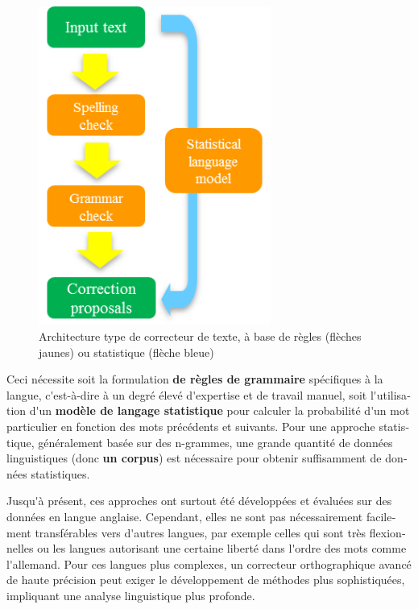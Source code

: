 \documentclass[]{../metanetpaper}
\begin{document}
\begin{french}
\begin{multicols}{2}
\begin{figure}[!ht]
\begin{center}
  \includegraphics[width=3.0in]{../_media/french/french_pix6_spell_checker.png}
\caption{Architecture type de correcteur de texte, à base de règles (flèches jaunes) ou statistique (flèche bleue)}
\label{fig:spellchecker}
\end{center}
\end{figure}

Ceci nécessite soit la formulation {\bf de règles
de grammaire} spécifiques à la langue, c{\mbox '}est-à-dire à un degré élevé d{\mbox '}expertise et de travail
manuel, soit l{\mbox '}utilisation d{\mbox '}un {\bf modèle de langage statistique} pour
calculer la probabilité d{\mbox '}un mot particulier en fonction des mots
précédents et suivants. Pour une approche statistique, généralement
basée sur des n-grammes, une grande quantité de données linguistiques
(donc {\bf un corpus}) est nécessaire pour obtenir suffisamment de données
statistiques.

Jusqu{\mbox '}à présent, ces approches ont surtout été développées et évaluées
sur des données en langue anglaise. Cependant, elles ne sont pas
nécessairement facilement transférables vers d{\mbox '}autres langues, par
exemple celles qui sont très flexionnelles ou les langues autorisant
une certaine liberté dans l{\mbox '}ordre des mots comme l{\mbox '}allemand. Pour ces langues
plus complexes, un correcteur orthographique avancé de haute précision
peut exiger le développement de méthodes plus sophistiquées,
impliquant une analyse linguistique plus profonde.


\end{multicols}
\end{french}
\end{document}
